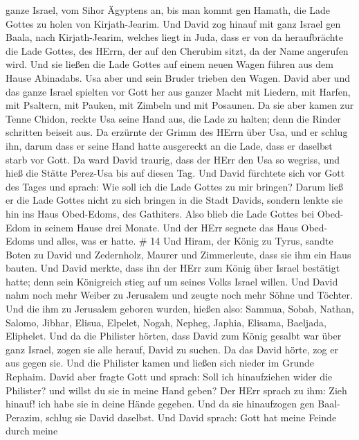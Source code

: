 ganze Israel, vom Sihor Ägyptens an, bis man kommt gen Hamath, die Lade
Gottes zu holen von Kirjath-Jearim.  Und David zog hinauf
mit ganz Israel gen Baala, nach Kirjath-Jearim, welches liegt in Juda,
dass er von da heraufbrächte die Lade Gottes, des HErrn, der auf den
Cherubim sitzt, da der Name angerufen wird.  Und sie ließen
die Lade Gottes auf einem neuen Wagen führen aus dem Hause Abinadabs.
Usa aber und sein Bruder trieben den Wagen.  David aber und
das ganze Israel spielten vor Gott her aus ganzer Macht mit Liedern, mit
Harfen, mit Psaltern, mit Pauken, mit Zimbeln und mit Posaunen.
 Da sie aber kamen zur Tenne Chidon, reckte Usa seine Hand
aus, die Lade zu halten; denn die Rinder schritten beiseit aus.
 Da erzürnte der Grimm des HErrn über Usa, und er schlug
ihn, darum dass er seine Hand hatte ausgereckt an die Lade, dass er
daselbst starb vor Gott.  Da ward David traurig, dass der
HErr den Usa so wegriss, und hieß die Stätte Perez-Usa bis auf diesen
Tag.  Und David fürchtete sich vor Gott des Tages und
sprach: Wie soll ich die Lade Gottes zu mir bringen?  Darum
ließ er die Lade Gottes nicht zu sich bringen in die Stadt Davids,
sondern lenkte sie hin ins Haus Obed-Edoms, des Gathiters. 
Also blieb die Lade Gottes bei Obed-Edom in seinem Hause drei Monate.
Und der HErr segnete das Haus Obed-Edoms und alles, was er hatte. \# 14
 Und Hiram, der König zu Tyrus, sandte Boten zu David und
Zedernholz, Maurer und Zimmerleute, dass sie ihm ein Haus bauten.
 Und David merkte, dass ihn der HErr zum König über Israel
bestätigt hatte; denn sein Königreich stieg auf um seines Volks Israel
willen.  Und David nahm noch mehr Weiber zu Jerusalem und
zeugte noch mehr Söhne und Töchter.  Und die ihm zu
Jerusalem geboren wurden, hießen also: Sammua, Sobab, Nathan, Salomo,
 Jibhar, Elisua, Elpelet,  Nogah, Nepheg,
Japhia,  Elisama, Baeljada, Eliphelet.  Und da
die Philister hörten, dass David zum König gesalbt war über ganz Israel,
zogen sie alle herauf, David zu suchen. Da das David hörte, zog er aus
gegen sie.  Und die Philister kamen und ließen sich nieder
im Grunde Rephaim.  David aber fragte Gott und sprach: Soll
ich hinaufziehen wider die Philister? und willst du sie in meine Hand
geben? Der HErr sprach zu ihm: Zieh hinauf! ich habe sie in deine Hände
gegeben.  Und da sie hinaufzogen gen Baal-Perazim, schlug
sie David daselbst. Und David sprach: Gott hat meine Feinde durch meine

